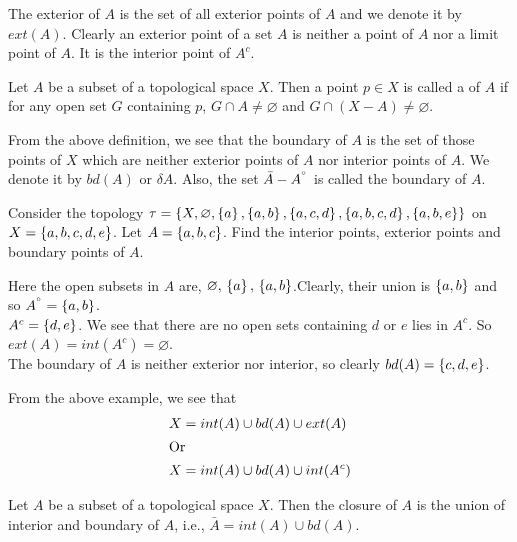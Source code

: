 \documentclass[../main-sheet.tex]{subfiles}
\begin{document}
The exterior of  \(A\) is the set of all exterior points of  \(A\) and we
denote it by  \(ext(A)\). Clearly an exterior point of a set  \(A\) is neither
a point of  \(A\) nor a limit point of  \(A\). It is the interior point of  \(A^{c}\).
\begin{defn}
    Let  \(A\) be a subset of a
    topological space  \(X\). Then a point  \(p\in X\) is called a  of  \(A\) if for any open set  \(G\)
    containing  \(p\),  \(G \cap A \neq \varnothing\) and  \(G \cap (X -A) \neq \varnothing\).
\end{defn}
From the above definition, we see that the boundary of  \(A\) is the
set of those points of  \(X\) which are neither exterior points of  \(A\) nor
interior points of  \(A\). We denote it by  \(bd(A)\) or  \(\delta A\). Also, the set
 \(\bar{A} - A^{\degree}\) is called the boundary of  \(A\).
\begin{ex}
    Consider the topology
     \(\tau =\left\{X,\varnothing,\left\{a\right\}, \left\{a,b\right\}, \left\{a, c, d\right\},\left\{a, b,c,d\right\},\left\{a,b,e\right\}\right\}\)
    on  \(X=\left\{a,b, c, d,e\right\}\). Let  \(A = \left\{a,b, c\right\}\). Find the interior points,
    exterior points and boundary points of  \(A\).
\end{ex}
\begin{soln}
    Here the open subsets in  \(A\) are,  \(\varnothing,\,\left\{a\right\},\, \left\{a,b\right\}\).Clearly, their union is  \(\left\{a, b\right\}\) and so  \(A^{\degree} = \left\{a,b\right\}\).\\
     \(A^{c}=\left\{d,e\right\}\). We see that there are no open sets containing  \(d\) or  \(e\)
    lies in  \(A^{c}\). So  \(ext(A)=int(A^c)=\varnothing\).\\
    The boundary of  \(A\) is neither exterior nor interior, so clearly
     \(bd(A)=\left\{c,d,e\right\}\).
\end{soln}
From the above example, we see that
\begin{align*}
    X&=int(A)\cup bd(A)\cup ext(A)\\
    \intertext{Or}
    X&=int(A)\cup bd(A)\cup int(A^{c})
\end{align*}
\begin{thm}
    Let  \(A\) be a subset of a topological space  \(X\). Then
    the closure of  \(A\) is the union of interior and boundary of  \(A\),
    i.e.,  \(\bar{A} = int(A) \cup bd(A)\).
\end{thm}
\end{document}
